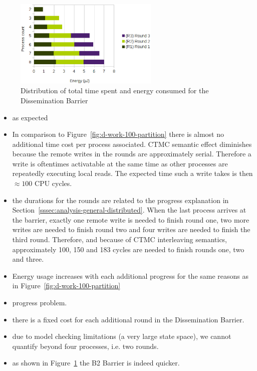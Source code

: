 \documentclass[a4paper, 10pt]{article}
\begin{document}
\begin{itemize}
\begin{figure}[htbp]
\begin{minipage}{0.43\linewidth}
			\end{minipage}
			\begin{minipage}{0.56\linewidth}
				\includegraphics[height=4.2cm]{charts/d-energy-work-1000-partition}
			\end{minipage}
			\caption{Distribution of total time spent and energy consumed for the Dissemination Barrier}
			\label{fig:d-work-1000-partition}
		\end{figure}
		\begin{itemize}
			\item as expected
			\item In comparison to Figure~\ref{fig:d-work-100-partition} there is almost no additional time cost per process associated. CTMC semantic effect diminishes because the remote writes in the rounds are approximately serial. Therefore a write is oftentimes activatable at the same time as other processes are repeatedly executing local reads. The expected time such a write takes is then $\approx 100$ CPU cycles.
			\item the durations for the rounds are related to the progress explanation in Section~\ref{sssec:analysis-general-distributed}. When the last process arrives at the barrier, exactly one remote write is needed to finish round one, two more writes are needed to finish round two and four writes are needed to finish the third round. Therefore, and because of CTMC interleaving semantics, approximately 100, 150 and 183 cycles are needed to finish rounds one, two and three.
			\item Energy usage increases with each additional progress for the same reasons as in Figure~\ref{fig:d-work-100-partition}
			\item progress problem.
			\item there is a fixed cost for each additional round in the Dissemination Barrier.
			\item due to model checking limitations (a very large state space), we cannot quantify beyond four processes, i.e. two rounds.
			\item as shown in Figure~\ref{fig:d-work-1000-partition} the B2 Barrier is indeed quicker.

\end{itemize}
\end{itemize}
\end{document}
